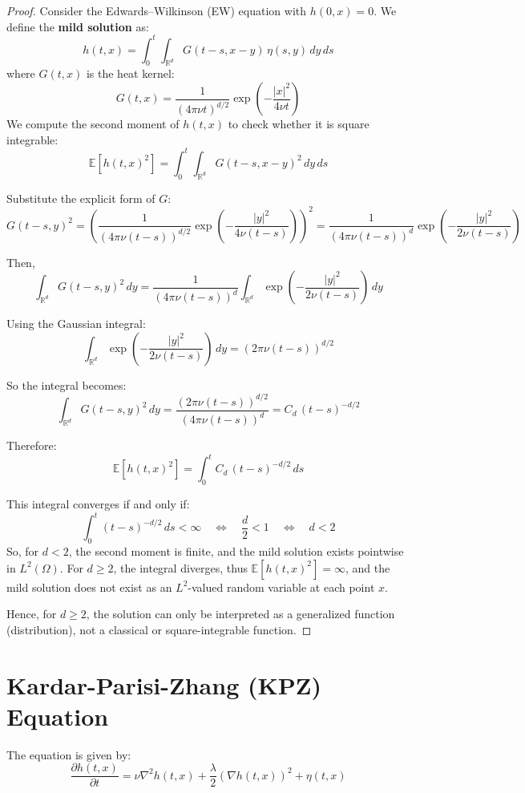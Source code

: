 \begin{proof}
    Consider the Edwards–Wilkinson (EW) equation with $h(0,x) = 0$. We define the \textbf{mild solution} as:
\[
h(t,x) = \int_0^t \int_{\mathbb{R}^d} G(t-s, x - y)\, \eta(s,y)\, dy\, ds
\]
where \( G(t,x) \) is the heat kernel:
\[
G(t,x) = \frac{1}{(4\pi \nu t)^{d/2}} \exp\left(-\frac{|x|^2}{4\nu t}\right)
\]
We compute the second moment of \( h(t,x) \) to check whether it is square integrable:
\[
\mathbb{E}[h(t,x)^2] = \int_0^t \int_{\mathbb{R}^d} G(t-s, x - y)^2\, dy\, ds
\]

Substitute the explicit form of \( G \):
\[
G(t-s, y)^2 = \left(\frac{1}{(4\pi \nu (t-s))^{d/2}} \exp\left(-\frac{|y|^2}{4\nu (t-s)}\right)\right)^2
= \frac{1}{(4\pi \nu (t-s))^d} \exp\left(-\frac{|y|^2}{2\nu (t-s)}\right)
\]

Then,
\[
\int_{\mathbb{R}^d} G(t-s, y)^2\, dy
= \frac{1}{(4\pi \nu (t-s))^d} \int_{\mathbb{R}^d} \exp\left(-\frac{|y|^2}{2\nu (t-s)}\right)\, dy
\]

Using the Gaussian integral:
\[
\int_{\mathbb{R}^d} \exp\left(-\frac{|y|^2}{2\nu (t-s)}\right)\, dy
= (2\pi \nu (t-s))^{d/2}
\]

So the integral becomes:
\[
\int_{\mathbb{R}^d} G(t-s, y)^2\, dy
= \frac{(2\pi \nu (t-s))^{d/2}}{(4\pi \nu (t-s))^d}
= C_d\, (t-s)^{-d/2}
\]

Therefore:
\[
\mathbb{E}[h(t,x)^2] = \int_0^t C_d\, (t-s)^{-d/2}\, ds
\]

This integral converges if and only if:
\[
\int_0^t (t-s)^{-d/2}\, ds < \infty \quad \Longleftrightarrow \quad \frac{d}{2} < 1 \quad \Longleftrightarrow \quad d < 2
\]
So, for \( d < 2 \), the second moment is finite, and the mild solution exists pointwise in \( L^2(\Omega) \).
For \( d \geq 2 \), the integral diverges, thus \( \mathbb{E}[h(t,x)^2] = \infty \), and the mild solution does not exist as an \( L^2 \)-valued random variable at each point \( x \).

Hence, for \( d \geq 2 \), the solution can only be interpreted as a generalized function (distribution), not a classical or square-integrable function.
\end{proof}

\section{Kardar-Parisi-Zhang (KPZ) Equation}
The equation is given by:
\[
\frac{\partial h(t,x)}{\partial t} = \nu \nabla^2 h(t,x) + \frac{\lambda}{2} \left( \nabla h(t,x) \right)^2 + \eta(t,x)
\]

